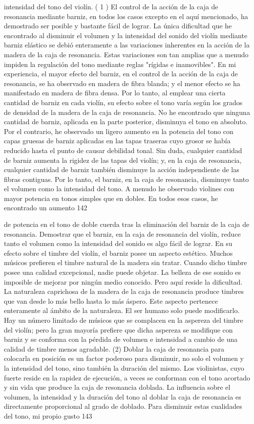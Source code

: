 intensidad del tono del violín.
( 1 ) El control de la acción de la caja de resonancia mediante barniz, en todos los casos excepto en el aquí mencionado, ha demostrado ser posible y bastante fácil de lograr. La única dificultad que he encontrado al disminuir el volumen y la intensidad del sonido del violín mediante barniz elástico se debió enteramente a las variaciones inherentes en la acción de la madera de la caja de resonancia. Estas variaciones son tan amplias que a menudo impiden la regulación del tono mediante reglas "rígidas e inamovibles". En mi experiencia, el mayor efecto del barniz, en el control de la acción de la caja de resonancia, se ha observado en madera de fibra blanda; y el menor efecto se ha manifestado en madera de fibra densa. Por lo tanto, al emplear una cierta cantidad de barniz en cada violín, su efecto sobre el tono varía según los grados de densidad de la madera de la caja de resonancia.
No he encontrado que ninguna cantidad de barniz, aplicada en la parte posterior, disminuya el tono en absoluto. Por el contrario, he observado un ligero aumento en la potencia del tono con capas gruesas de barniz aplicadas en las tapas traseras cuyo grosor se había reducido hasta el punto de causar debilidad tonal. Sin duda, cualquier cantidad de barniz aumenta la rigidez de las tapas del violín; y, en la caja de resonancia, cualquier cantidad de barniz también disminuye la acción independiente de las fibras contiguas. Por lo tanto, el barniz, en la caja de resonancia, disminuye tanto el volumen como la intensidad del tono. A menudo he observado violines con mayor potencia en tonos simples que en dobles. En todos esos casos, he encontrado un aumento
142

de potencia en el tono de doble cuerda tras la eliminación del barniz de la caja de resonancia. Demostrar que el barniz, en la caja de resonancia del violín, reduce tanto el volumen como la intensidad del sonido es algo fácil de lograr.
En su efecto sobre el timbre del violín, el barniz posee un aspecto estético. Muchos músicos prefieren el timbre natural de la madera sin tratar. Cuando dicho timbre posee una calidad excepcional, nadie puede objetar. La belleza de ese sonido es imposible de mejorar por ningún medio conocido. Pero aquí reside la dificultad. La naturaleza caprichosa de la madera de la caja de resonancia produce timbres que van desde lo más bello hasta lo más áspero. Este aspecto pertenece enteramente al ámbito de la naturaleza. El ser humano solo puede modificarlo. Hay un número limitado de músicos que se complacen en la aspereza del timbre del violín; pero la gran mayoría prefiere que dicha aspereza se modifique con barniz y se conforma con la pérdida de volumen e intensidad a cambio de una calidad de timbre menos agradable.
(2) Doblar la caja de resonancia para colocarla en posición es un factor poderoso para disminuir, no solo el volumen y la intensidad del tono, sino también la duración del mismo. Los violinistas, cuyo fuerte reside en la rapidez de ejecución, a veces se conforman con el tono acortado y sin vida que produce la caja de resonancia doblada. La influencia sobre el volumen, la intensidad y la duración del tono al doblar la caja de resonancia es directamente proporcional al grado de doblado. Para disminuir estas cualidades del tono, mi propio gusto
143


